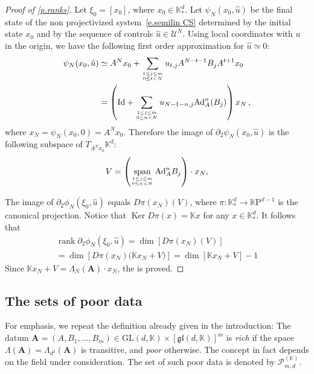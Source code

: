 \documentclass[10pt, a4paper]{amsart}
\theoremstyle{plain}
\theoremstyle{definition}
\theoremstyle{remark}
\theoremstyle{note}
\numberwithin{equation}{section}
\begin{document}
\begin{proof}[Proof of \cref{p.ranks}]
Let $\xi_0 = [x_0]$, where $x_0\in {\mathbb{K}}^d_*$.
Let $\psi_N(x_0,\hat{u})$ be the final state 
of the non projectivized system~\eqref{e.semilin CS}  determined by the initial state $x_0$ 
and by the sequence of controls $\hat{u}\in {\mathcal{U}}^N$.
Using local coordinates with $u$ in the origin,
we have the following first order approximation for $\hat{u}\simeq 0$:
\begin{align*}
\psi_N(x_0,\hat{u}) &\simeq A^N x_0 + 
\sum_{1\leq j\leq m \atop 0 \leq t<N}u_{t,j}A^{N-t-1}B_{j} A^{t+1} x_0 \\
&= 
\left({\mathrm{Id}} + \sum_{1\leq j\leq m \atop 0 \leq n < N} u_{N-1-n,j}{\mathrm{Ad}}_A^n(B_{j})\right) x_N \, ,
\end{align*}
where $x_N = \psi_N(x_0,0) = A^N x_0$.  
Therefore the image of 
$\partial_2 \psi_N(x_0,\hat{u})$
is the following subspace of $T_{A^N x_0} {\mathbb{K}}^d$:
\begin{align*}
V = \left(\operatorname*{span}_{1\leq j\leq m\atop 0\leq n<N}{\mathrm{Ad}}_A^n B_{j} \right) \cdot x_N ,
\end{align*}

The image of $\partial_2 \phi_N(\xi_0,\hat{u})$
equals $D\pi(x_N)(V)$, where $\pi: {\mathbb{K}}^d_* \to {\mathbb{K}\mathrm{P}}^{d-1}$ is the canonical projection.
Notice that $\operatorname{Ker} D\pi(x) = {\mathbb{K}} x$ for any $x \in {\mathbb{K}}^d_*$.
It follows that 
\begin{multline*}
\operatorname{rank} \partial_2 \phi_N(\xi_0,\hat{u})
 = \dim \left[ D\pi(x_N) (V) \right]
\\
 = \dim \left[ D\pi(x_N) \big({\mathbb{K}} x_N + V\big) \right]
 = \dim [{\mathbb{K}} x_N + V] - 1
\end{multline*}
Since ${\mathbb{K}} x_N + V = \Lambda_N({\mathbf{A}})\cdot x_N$,
the  is proved.
\end{proof}

\subsection{The sets of poor data}\label{ss.poor_set}

For emphasis, we repeat the definition already given in the introduction:
The datum ${\mathbf{A}} = (A, B_1, \dots, B_m) \in {\mathrm{GL}}(d,{\mathbb{K}}) \times [{\mathfrak{gl}}(d,{\mathbb{K}})]^m$
is \emph{rich} if the space $\Lambda({\mathbf{A}}) = \Lambda_{d^2}({\mathbf{A}})$  is transitive,
and \emph{poor} otherwise.
The concept in fact depends on the field under consideration.
The set of such poor data is denoted by ${\mathcal{P}}_{m,d}^{({\mathbb{K}})}$.
\end{document}
